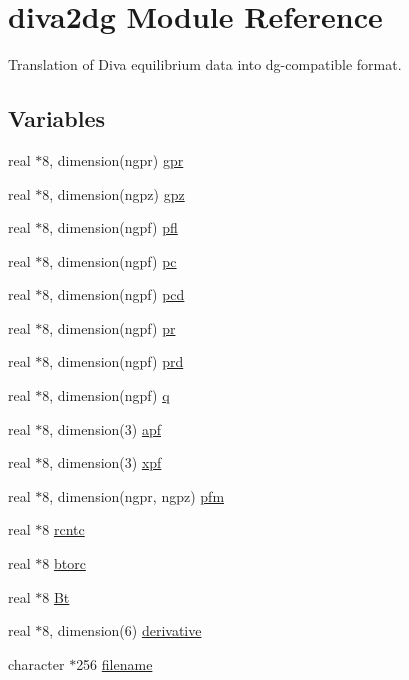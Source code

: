 \hypertarget{namespacediva2dg}{
\section{diva2dg Module Reference}
\label{namespacediva2dg}
}
Translation of Diva equilibrium data into dg-compatible format.  


\subsection*{Variables}
\begin{CompactItemize}
\item 
real $\ast$8, dimension(ngpr) \hyperlink{namespacediva2dg_35a63eee0b80c66baac30a3de0be0be9}{gpr}
\item 
real $\ast$8, dimension(ngpz) \hyperlink{namespacediva2dg_b3cfb25ed528c0d24d80d968099c69ea}{gpz}
\item 
real $\ast$8, dimension(ngpf) \hyperlink{namespacediva2dg_321f730bc6ba784a50be03bfc676e6b8}{pfl}
\item 
real $\ast$8, dimension(ngpf) \hyperlink{namespacediva2dg_cdb5a604b2a0c574c93685c0135a1cb1}{pc}
\item 
real $\ast$8, dimension(ngpf) \hyperlink{namespacediva2dg_002854ccd8f06e9862a53c8e55667130}{pcd}
\item 
real $\ast$8, dimension(ngpf) \hyperlink{namespacediva2dg_0fddfb0fc5baf44d76608830e93f933c}{pr}
\item 
real $\ast$8, dimension(ngpf) \hyperlink{namespacediva2dg_28afc7cdeb0d17dfc2f755ee01aa119f}{prd}
\item 
real $\ast$8, dimension(ngpf) \hyperlink{namespacediva2dg_c30c06cc584a484217b2e77ea4afefb0}{q}
\item 
real $\ast$8, dimension(3) \hyperlink{namespacediva2dg_4af07d7599c2950bdf3884c213a9dc0e}{apf}
\item 
real $\ast$8, dimension(3) \hyperlink{namespacediva2dg_7c5baa5f6aeaf641f17822bf2c727e65}{xpf}
\item 
real $\ast$8, dimension(ngpr, ngpz) \hyperlink{namespacediva2dg_ac412e391d7bc3f388a20118b792a62d}{pfm}
\item 
real $\ast$8 \hyperlink{namespacediva2dg_8de740eca25720b2d20619260c87f18a}{rcntc}
\item 
real $\ast$8 \hyperlink{namespacediva2dg_9de71c8856c2b2d0a48aff84e01eb7cf}{btorc}
\item 
real $\ast$8 \hyperlink{namespacediva2dg_d338316587924c2d6f35996f556aad88}{Bt}
\item 
real $\ast$8, dimension(6) \hyperlink{namespacediva2dg_f75800039ab67d18c3a79738e48309d0}{derivative}
\item 
character $\ast$256 \hyperlink{namespacediva2dg_698afd231129418ec2b8c08ee235931d}{filename}
\end{CompactItemize}


